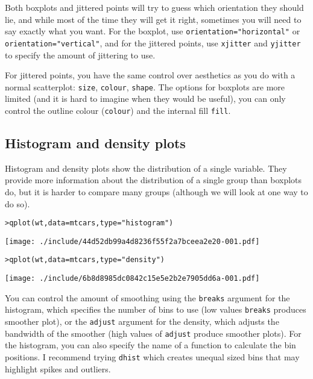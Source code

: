 Both boxplots and jittered points will try to guess which orientation they should lie, and while most of the time they will get it right, sometimes you will need to say exactly what you want.  For the boxplot, use {\tt orientation="horizontal"} or {\tt orientation="vertical"}, and for the jittered points, use {\tt xjitter} and {\tt yjitter} to specify the amount of jittering to use. 

For jittered points, you have the same control over aesthetics as you do with a normal scatterplot: {\tt size}, {\tt colour}, {\tt shape}.  The options for boxplots are more limited (and it is hard to imagine when they would be useful), you can only control the outline colour ({\tt colour}) and the internal fill {\tt fill}.

\subsection{Histogram and density plots}\label{sub:density}

Histogram and density plots show the distribution of a single variable.  They provide more information about the distribution of a single group than boxplots do, but it is harder to compare many groups (although we will look at one way to do so).

\begin{alltt}
> qplot(wt, data = mtcars, type = "histogram")
\end{alltt}
\texttt{[image: ./include/44d52db99a4d8236f55f2a7bceea2e20-001.pdf]}
\begin{alltt}

> qplot(wt, data = mtcars, type = "density")
\end{alltt}
\texttt{[image: ./include/6b8d8985dc0842c15e5e2b2e7905dd6a-001.pdf]}
\begin{alltt}

\end{alltt}

You can control the amount of smoothing using the {\tt breaks} argument for the histogram, which specifies the number of bins to use (low values {\tt breaks} produces smoother plot), or the {\tt adjust} argument for the density, which adjusts the bandwidth of the smoother (high values of {\tt adjust} produce smoother plots).  For the histogram, you can also specify the name of a function to calculate the bin positions.  I recommend trying {\tt dhist} which creates unequal sized bins that may highlight spikes and outliers.

